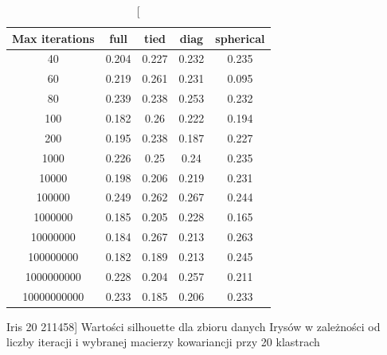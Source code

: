 \documentclass{classrep}
\begin{document}
{{\begin{table}[!htbp]
                \begin{minipage}{1\textwidth}
                \centering
                \begin{tabular}{|c|c|c|c|c|}
                \hline
                Max iterations & full & tied & diag & spherical \\ \hline
                40 & 0.204 & 0.227 & 0.232 & 0.235 \\ \hline
                60 & 0.219 & 0.261 & 0.231 & 0.095 \\ \hline
                80 & 0.239 & 0.238 & 0.253 & 0.232 \\ \hline
                100 & 0.182 & 0.26 & 0.222 & 0.194 \\ \hline
                200 & 0.195 & 0.238 & 0.187 & 0.227 \\ \hline
                1000 & 0.226 & 0.25 & 0.24 & 0.235 \\ \hline
                10000 & 0.198 & 0.206 & 0.219 & 0.231 \\ \hline
                100000 & 0.249 & 0.262 & 0.267 & 0.244 \\ \hline
                1000000 & 0.185 & 0.205 & 0.228 & 0.165 \\ \hline
                10000000 & 0.184 & 0.267 & 0.213 & 0.263 \\ \hline
                100000000 & 0.182 & 0.189 & 0.213 & 0.245 \\ \hline
                1000000000 & 0.228 & 0.204 & 0.257 & 0.211 \\ \hline
                10000000000 & 0.233 & 0.185 & 0.206 & 0.233 \\ \hline
                \end{tabular}
                \caption
                [Iris 20 211458]
                {Wartości silhouette dla zbioru danych Irysów w zależności od liczby
                iteracji i wybranej macierzy kowariancji przy 20 klastrach}
                \label{Iris_20_211458}
                \end{minipage}
                \hfill
            \end{table}
            
}}
\end{document}
